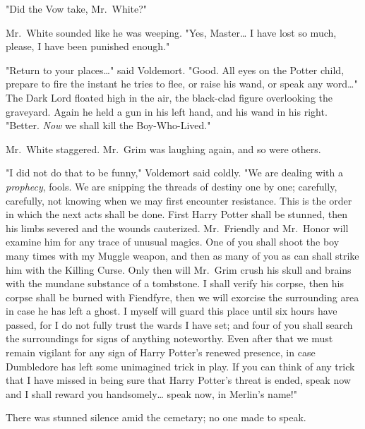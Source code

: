 "Did the Vow take, Mr.~White?"

Mr.~White sounded like he was weeping. "Yes, Master{\ldots} I have lost so
much, please, I have been punished enough."

"Return to your places{\ldots}" said Voldemort. "Good. All eyes on the Potter
child, prepare to fire the instant he tries to flee, or raise his wand, or
speak any word{\ldots}" The Dark Lord floated high in the air, the black-clad
figure overlooking the graveyard. Again he held a gun in his left hand, and his
wand in his right. "Better. \emph{Now} we shall kill the Boy-Who-Lived."

Mr.~White staggered. Mr.~Grim was laughing again, and so were others.

"I did not do that to be funny," Voldemort said coldly. "We are dealing with a
\emph{prophecy}, fools. We are snipping the threads of destiny one by one;
carefully, carefully, not knowing when we may first encounter resistance. This
is the order in which the next acts shall be done. First Harry Potter shall be
stunned, then his limbs severed and the wounds cauterized. Mr.~Friendly and
Mr.~Honor will examine him for any trace of unusual magics. One of you shall
shoot the boy many times with my Muggle weapon, and then as many of you as can
shall strike him with the Killing Curse. Only then will Mr.~Grim crush his
skull and brains with the mundane substance of a tombstone. I shall verify his
corpse, then his corpse shall be burned with Fiendfyre, then we will exorcise
the surrounding area in case he has left a ghost. I myself will guard this
place until six hours have passed, for I do not fully trust the wards I have
set; and four of you shall search the surroundings for signs of anything
noteworthy. Even after that we must remain vigilant for any sign of Harry
Potter's renewed presence, in case Dumbledore has left some unimagined trick in
play. If you can think of any trick that I have missed in being sure that Harry
Potter's threat is ended, speak now and I shall reward you handsomely{\ldots}
speak now, in Merlin's name!"

There was stunned silence amid the cemetary; no one made to speak.

